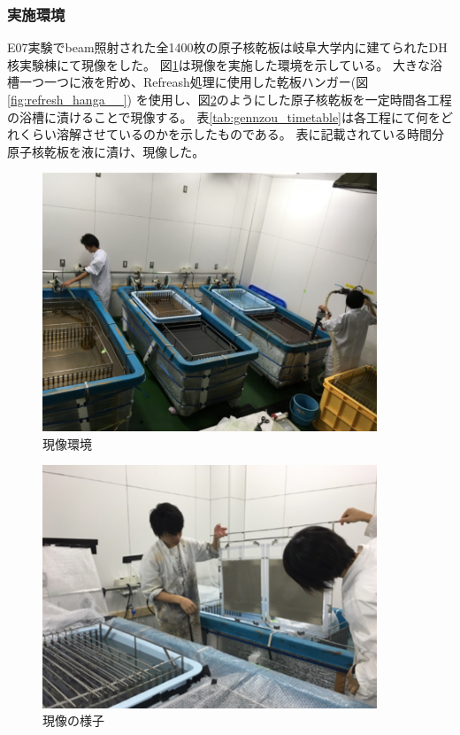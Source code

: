 \documentclass[12pt,a4paper]{jarticle}
\begin{document}
\subsubsection{実施環境}
E07実験でbeam照射された全1400枚の原子核乾板は岐阜大学内に建てられたDH核実験棟にて現像をした。
図\ref{fig:gennzou_bath}は現像を実施した環境を示している。
大きな浴槽一つ一つに液を貯め、Refreash処理に使用した乾板ハンガー(図\ref{fig:refresh_hanga__})
を使用し、図\ref{fig:emulsion_turusi}のようにした原子核乾板を一定時間各工程の浴槽に漬けることで現像する。
表\ref{tab:gennzou_timetable}は各工程にて何をどれくらい溶解させているのかを示したものである。
表に記載されている時間分原子核乾板を液に漬け、現像した。
\begin{figure}[htbp]
  \centering
     \includegraphics[width=100mm]{gennzou_condition.png}
  \caption{現像環境\label{fig:gennzou_bath}}
\end{figure}
\begin{figure}[htbp]
  \centering
     \includegraphics[width=100mm]{gennzou_turusi.png}
  \caption{現像の様子\label{fig:emulsion_turusi}}
\end{figure}
\end{document}
